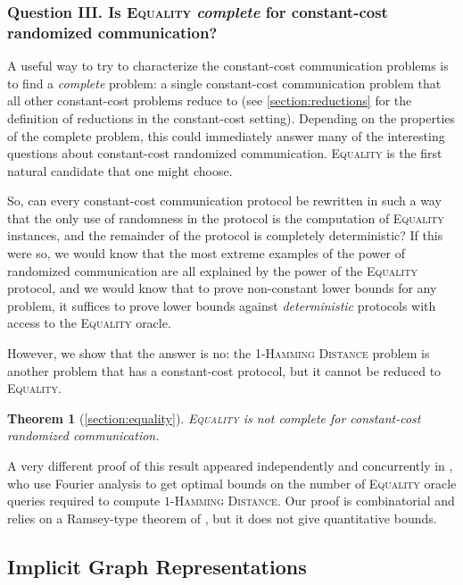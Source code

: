\documentclass{article}
\newtheorem{theorem}{Theorem}\newtheorem{lemma}[theorem]{Lemma}\newtheorem{proposition}[theorem]{Proposition}\newtheorem{corollary}[theorem]{Corollary}\newtheorem{definition}[theorem]{Definition}\newtheorem{claim}[theorem]{Claim}\newtheorem{remark}[theorem]{Remark}\newtheorem{observation}[theorem]{Observation}\newtheorem{conjecture}[theorem]{Conjecture}\newtheorem{example}[theorem]{Example}
\begin{document}
\subsubsection*{Question III. Is \textsc{Equality} \emph{complete} for constant-cost randomized communication?}

A useful way to try to characterize the constant-cost communication problems is to find a
\emph{complete} problem: a single constant-cost communication problem that all other constant-cost
problems reduce to (see \cref{section:reductions} for the definition of reductions in the
constant-cost setting). Depending on the properties of the complete problem, this could immediately
answer many of the interesting questions about constant-cost randomized communication.
\textsc{Equality} is the first natural candidate that one might choose.

So, can every constant-cost communication protocol be rewritten in such a way that the only use of
randomness in the protocol is the computation of \textsc{Equality} instances, and the remainder of
the protocol is completely deterministic?  If this were so, we would know that the most extreme
examples of the power of randomized communication are all explained by the power of the
\textsc{Equality} protocol, and we would know that to prove non-constant lower bounds for any
problem, it suffices to prove lower bounds against \emph{deterministic} protocols with access to the
\textsc{Equality} oracle. 

However, we show that the answer is no: the \textsc{1-Hamming Distance} problem is another problem
that has a constant-cost protocol, but it cannot be reduced to \textsc{Equality}. 
\begin{theorem}[\cref{section:equality}]
\textsc{Equality} is not complete for constant-cost randomized communication.
\end{theorem}
A very different proof of this result appeared independently and concurrently in
\cite{HHH23dimfree}, who use Fourier analysis to get optimal bounds on the number of
\textsc{Equality} oracle queries required to compute \textsc{$1$-Hamming Distance}.  Our proof is
combinatorial and relies on a Ramsey-type theorem of \cite{ARSV06}, but it does not give
quantitative
bounds.

\subsection{Implicit Graph Representations}
\label{section:intro-implicit}
\end{document}
